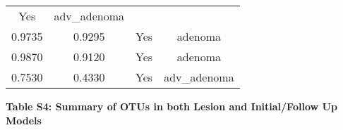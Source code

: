 \documentclass[12pt,]{article}
\begin{document}
\begin{longtable}[]{@{}cccc@{}}
\begin{minipage}[t]{0.22\columnwidth}
Yes\strut
\end{minipage} & \begin{minipage}[t]{0.16\columnwidth}\centering\strut
adv\_adenoma\strut
\end{minipage}\tabularnewline
\begin{minipage}[t]{0.24\columnwidth}\centering\strut
0.9735\strut
\end{minipage} & \begin{minipage}[t]{0.26\columnwidth}\centering\strut
0.9295\strut
\end{minipage} & \begin{minipage}[t]{0.22\columnwidth}\centering\strut
Yes\strut
\end{minipage} & \begin{minipage}[t]{0.16\columnwidth}\centering\strut
adenoma\strut
\end{minipage}\tabularnewline
\begin{minipage}[t]{0.24\columnwidth}\centering\strut
0.9870\strut
\end{minipage} & \begin{minipage}[t]{0.26\columnwidth}\centering\strut
0.9120\strut
\end{minipage} & \begin{minipage}[t]{0.22\columnwidth}\centering\strut
Yes\strut
\end{minipage} & \begin{minipage}[t]{0.16\columnwidth}\centering\strut
adenoma\strut
\end{minipage}\tabularnewline
\begin{minipage}[t]{0.24\columnwidth}\centering\strut
0.7530\strut
\end{minipage} & \begin{minipage}[t]{0.26\columnwidth}\centering\strut
0.4330\strut
\end{minipage} & \begin{minipage}[t]{0.22\columnwidth}\centering\strut
Yes\strut
\end{minipage} & \begin{minipage}[t]{0.16\columnwidth}\centering\strut
adv\_adenoma\strut
\end{minipage}\tabularnewline
\bottomrule
\end{longtable}

\newpage

\textbf{Table S4: Summary of OTUs in both Lesion and Initial/Follow Up
Models}
\end{document}

